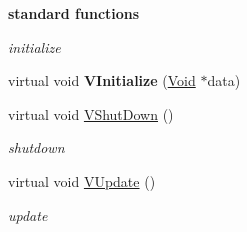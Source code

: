 \begin{Indent}{\bf standard functions}\par
{\em \label{_amgrp57f1c50bd31a278c7d9f58b3e669c84c}
 initialize }\begin{DoxyCompactItemize}
\item 
\hypertarget{classPlatform_1_1Platform_1_1Platform_a14c2dafce42e067a9e0607b6affe140a}{
virtual void {\bfseries VInitialize} (\hyperlink{structVoid}{Void} $\ast$data)}
\label{classPlatform_1_1Platform_1_1Platform_a14c2dafce42e067a9e0607b6affe140a}

\item 
\hypertarget{classPlatform_1_1Platform_1_1Platform_a9119d58ec258162592c8a9464bd56e93}{
virtual void \hyperlink{classPlatform_1_1Platform_1_1Platform_a9119d58ec258162592c8a9464bd56e93}{VShutDown} ()}
\label{classPlatform_1_1Platform_1_1Platform_a9119d58ec258162592c8a9464bd56e93}

\begin{DoxyCompactList}\small\item\em shutdown \item\end{DoxyCompactList}\item 
\hypertarget{classPlatform_1_1Platform_1_1Platform_abbbf16cfc70749d357c56e56758ffded}{
virtual void \hyperlink{classPlatform_1_1Platform_1_1Platform_abbbf16cfc70749d357c56e56758ffded}{VUpdate} ()}
\label{classPlatform_1_1Platform_1_1Platform_abbbf16cfc70749d357c56e56758ffded}

\begin{DoxyCompactList}\small\item\em update \item\end{DoxyCompactList}\end{DoxyCompactItemize}
\end{Indent}
